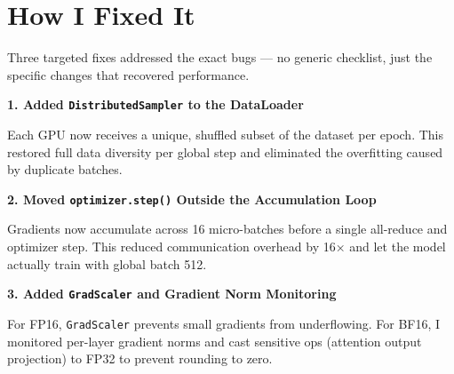 \documentclass[11pt]{article}
\begin{document}
\vfill
\newpage


\section*{How I Fixed It}

\vspace{0.1in}

Three targeted fixes addressed the exact bugs — no generic checklist, just the specific changes that recovered performance.

\vspace{0.15in}

\begin{darkbox}
\textbf{1. Added \texttt{DistributedSampler} to the DataLoader}

Each GPU now receives a unique, shuffled subset of the dataset per epoch. This restored full data diversity per global step and eliminated the overfitting caused by duplicate batches.
\end{darkbox}

\vspace{0.15in}

\begin{darkbox}
\textbf{2. Moved \texttt{optimizer.step()} Outside the Accumulation Loop}

Gradients now accumulate across 16 micro-batches before a single all-reduce and optimizer step. This reduced communication overhead by 16× and let the model actually train with global batch 512.
\end{darkbox}

\vspace{0.15in}

\begin{darkbox}
\textbf{3. Added \texttt{GradScaler} and Gradient Norm Monitoring}

For FP16, \texttt{GradScaler} prevents small gradients from underflowing. For BF16, I monitored per-layer gradient norms and cast sensitive ops (attention output projection) to FP32 to prevent rounding to zero.
\end{darkbox}

\vfill
\newpage

\end{document}
